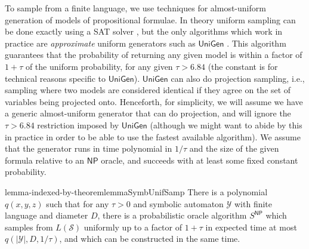 \documentclass[a4paper,USenglish,numberwithinsect]{lipics}
\theoremstyle{plain}
\theoremstyle{definition}
\newcommand{\NP}{\ensuremath{\mathsf{NP}}}
\newcommand{\UniGen}{\ensuremath{\mathsf{UniGen}}}
\begin{document}
To sample from a finite language, we use techniques for almost-uniform
generation of models of propositional formulae. In theory uniform
sampling can be done exactly using a SAT solver \cite{bgp}, but the
only algorithms which work in practice are \emph{approximate} uniform
generators such as {\UniGen} \cite{unigen}. This algorithm guarantees
that the probability of returning any given model is within a factor
of $1 + \tau$ of the uniform probability, for any given $\tau > 6.84$
(the constant is for technical reasons specific to
{\UniGen}). {\UniGen} can also do projection sampling, i.e., sampling
where two models are considered identical if they agree on the set of
variables being projected onto. Henceforth, for simplicity, we will
assume we have a generic almost-uniform generator that can do
projection, and will ignore the $\tau > 6.84$ restriction imposed by
{\UniGen} (although we might want to abide by this in practice in
order to be able to use the fastest available algorithm). We assume
that the generator runs in time polynomial in $1/\tau$ and the size of
the given formula relative to an {\NP} oracle, and succeeds with at
least some fixed constant probability. 
\begin{restatable}{lemma-indexed-by-theorem}{lemmaSymbUnifSamp} \label{lemma:symb-unif-samp}
There is a polynomial $q(x,y,z)$ such that for any $\tau > 0$ and symbolic automaton $\mathcal{Y}$ with finite language and diameter $D$, there is a probabilistic oracle algorithm $S^{\NP}$ which samples from $L(\mathcal{S})$ uniformly up to a factor of $1+\tau$ in expected time at most $q(|\mathcal{Y}|, D, 1/\tau)$, and which can be constructed in the same time.
\end{restatable}
\end{document}

